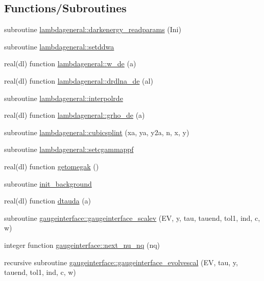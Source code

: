 \subsection*{Functions/\+Subroutines}
\begin{DoxyCompactItemize}
\item 
subroutine \mbox{\hyperlink{namespacelambdageneral_a780328d728ca15af725d6f53b2fa54d1}{lambdageneral\+::darkenergy\+\_\+readparams}} (Ini)
\item 
subroutine \mbox{\hyperlink{namespacelambdageneral_ad21de3de68d0d0e75156e818dd8b49e1}{lambdageneral\+::setddwa}}
\item 
real(dl) function \mbox{\hyperlink{namespacelambdageneral_a5025e65d45f07326ea66833cbab495d3}{lambdageneral\+::w\+\_\+de}} (a)
\item 
real(dl) function \mbox{\hyperlink{namespacelambdageneral_a446a7b395384f258ea37364624b12206}{lambdageneral\+::drdlna\+\_\+de}} (al)
\item 
subroutine \mbox{\hyperlink{namespacelambdageneral_ac5a1ca91bd76eaf1d2f8e05944b798d6}{lambdageneral\+::interpolrde}}
\item 
real(dl) function \mbox{\hyperlink{namespacelambdageneral_a07db6feea7db4bda2dd9465dafa7895f}{lambdageneral\+::grho\+\_\+de}} (a)
\item 
subroutine \mbox{\hyperlink{namespacelambdageneral_ac223e519da99aef58a91fb3932b7c438}{lambdageneral\+::cubicsplint}} (xa, ya, y2a, n, x, y)
\item 
subroutine \mbox{\hyperlink{namespacelambdageneral_a2e52a5cb604fe6d314c2bdbfc3d6b723}{lambdageneral\+::setcgammappf}}
\item 
real(dl) function \mbox{\hyperlink{equations__ppf_8f90_a2c95a3b42a68aa87a21097ce3ff8bbe6}{getomegak}} ()
\item 
subroutine \mbox{\hyperlink{equations__ppf_8f90_a47540f6082acc64c78a1daac45637fd6}{init\+\_\+background}}
\item 
real(dl) function \mbox{\hyperlink{equations__ppf_8f90_a1c228811398a4401bb57d778911a13df}{dtauda}} (a)
\item 
subroutine \mbox{\hyperlink{namespacegaugeinterface_ac02938234bdca8dcd23649b1abb34ab3}{gaugeinterface\+::gaugeinterface\+\_\+scalev}} (EV, y, tau, tauend, tol1, ind, c, w)
\item 
integer function \mbox{\hyperlink{namespacegaugeinterface_ae317d979138ff46a65c14f787c0d749c}{gaugeinterface\+::next\+\_\+nu\+\_\+nq}} (nq)
\item 
recursive subroutine \mbox{\hyperlink{namespacegaugeinterface_a11f5c8bd6a22537e4a85362dc8dbf3af}{gaugeinterface\+::gaugeinterface\+\_\+evolvescal}} (EV, tau, y, tauend, tol1, ind, c, w)

\end{DoxyCompactItemize}
